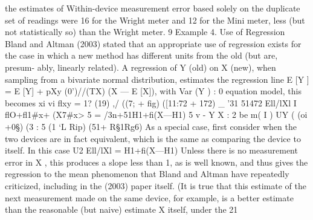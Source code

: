 the estimates of Within-device measurement error based solely on the duplicate set
of readings were 16 for the Wright meter and 12 for the Mini meter, less (but not
statistically so) than the Wright meter.
9 Example 4. Use of Regression
Bland and Altman (2003) stated that an appropriate use of regression exists for
the case in which a new method has different units from the old (but are, presum-
ably, linearly related). A regression of Y (old) on X (new), when sampling from
a bivariate normal distribution, estimates the regression line E [Y \X] = E [Y] +
pXy (0')//(TX) (X — E [X]), with Var (Y \X) : 0%
equation model, this becomes
xi vi
ﬂxy = 1? (19)
,/ ((7; + ﬁg) ([11:72 + 172)
_ '31
51472
Ell/lXl I ﬂO+ﬂ1#x+ (X7#x>
5
= /3n+51H1+ﬁ(X—H1)
5%
v - Y X : 2 be
m( I ) UY ( (oi +0§) (3%
: 5%
(1 ‘L Rip) (51+ R§1Rg6)
As a special case, ﬁrst consider when the two devices are in fact equivalent, which
is the same as comparing the device to itself. In this case
U2
Ell/lXl = H1+ﬁ(X—H1)
Unless there is no measurement error in X , this produces a slope less than 1, as is
well known, and thus gives the regression to the mean phenomenon that Bland and
Altman have repeatedly criticized, including in the (2003) paper itself. (It is true
that this estimate of the next measurement made on the same device, for example,
is a better estimate than the reasonable (but naive) estimate X itself, under the
21



